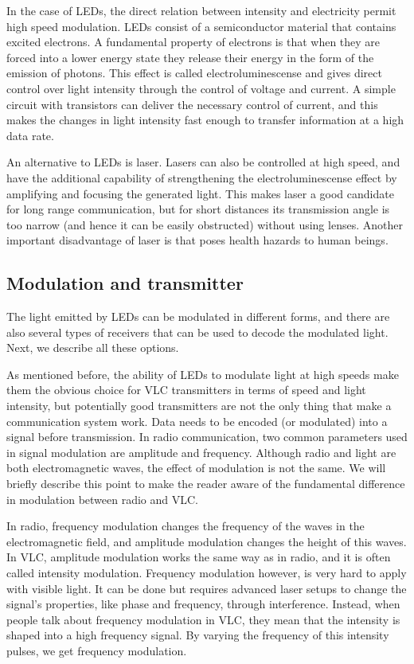 In the case of LEDs, the direct relation between intensity and electricity permit
high speed modulation. LEDs consist of a semiconductor material that contains
excited electrons. A fundamental property of electrons is that when they are
forced into a lower energy state they release their energy in the form of the emission
of photons. This effect is called electroluminescense and gives direct control
over light intensity through the control of voltage and current. A simple circuit
with transistors can deliver the necessary control of current, and this makes the
changes in light intensity fast enough to transfer information at a high data rate.

An alternative to LEDs is laser. Lasers can also be controlled at high speed, and
have the additional capability of strengthening the electroluminescense effect by
amplifying and focusing the generated light. This makes laser a good candidate
for long range communication, but for short distances its transmission angle is too
narrow (and hence it can be easily obstructed) without using lenses. Another
important disadvantage of laser is that poses health hazards to human beings.

\subsection{Modulation and transmitter}

The light emitted by LEDs can be modulated in different forms, and there are also
several types of receivers that can be used to decode the modulated light. Next,
we describe all these options.

As mentioned before, the ability of LEDs to modulate light at high speeds make
them the obvious choice for VLC transmitters in terms of speed and light intensity,
but potentially good transmitters are not the only thing that make a communication
system work. Data needs to be encoded (or modulated) into a signal before
transmission.
In radio communication, two common parameters used in signal modulation
are amplitude and frequency. Although radio and light are both electromagnetic
waves, the effect of modulation is not the same. We will briefly describe this point
to make the reader aware of the fundamental difference in modulation between
radio and VLC.

In radio, frequency modulation changes the frequency of the waves in the electromagnetic
field, and amplitude modulation changes the height of this waves.
In VLC, amplitude modulation works the same way as in radio, and it is often
called intensity modulation. Frequency modulation however, is very hard to apply
with visible light. It can be done but requires advanced laser setups to change
the signal’s properties, like phase and frequency, through interference. Instead,
when people talk about frequency modulation in VLC, they mean that the intensity
is shaped into a high frequency signal. By varying the frequency of this intensity
pulses, we get frequency modulation.

